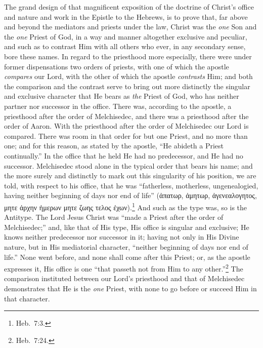 \documentclass[
  english,
]{book}
\newcommand{\textgreek}[2][]{\foreignlanguage{greek}{#2}}
\begin{document}
The grand design of that magnificent exposition of the doctrine of Christ's office and nature and work in the Epistle to the Hebrews, is to prove that, far above and beyond the mediators and priests under the law, Christ was the \emph{one} Son and the \emph{one} Priest of God, in a way and manner altogether exclusive and peculiar, and such as to contrast Him with all others who ever, in any secondary sense, bore these names. In regard to the priesthood more especially, there were under former dispensations two orders of priests, with one of which the apostle \emph{compares} our Lord, with the other of which the apostle \emph{contrasts} Him; and both the comparison and the contrast serve to bring out more distinctly the singular and exclusive character that He bears as \emph{the} Priest of God, who has neither partner nor successor in the office. There was, according to the apostle, a priesthood after the order of Melchisedec, and there was a priesthood after the order of Aaron. With the priesthood after the order of Melchisedec our Lord is compared. There was room in that order for but one Priest, and no more than one; and for this reason, as stated by the apostle, ``He abideth a Priest continually.'' In the office that he held He had no predecessor, and He had no successor. Melchisedec stood alone in the typical order that bears his name; and the more surely and distinctly to mark out this singularity of his position, we are told, with respect to his office, that he was ``fatherless, motherless, ungenealogied, having neither beginning of days nor end of life'' (\textgreek{ἀπατωρ, ἀμητωρ, ἀγενεαλογητος, μητε ἀρχην ἡμερων μητε ζωης τελος ἐχων}).\footnote{Heb.~7:3.} And such as the type was, so is the Antitype. The Lord Jesus Christ was ``made a Priest after the order of Melchisedec;'' and, like that of His type, His office is singular and exclusive; He knows neither predecessor nor successor in it; having not only in His Divine nature, but in His mediatorial character, ``neither beginning of days nor end of life.'' None went before, and none shall come after this Priest; or, as the apostle expresses it, His office is one ``that passeth not from Him to any other.''\footnote{Heb.~7:24.} The comparison instituted between our Lord's priesthood and that of Melchisedec demonstrates that He is the \emph{one} Priest, with none to go before or succeed Him in that character.
\end{document}
